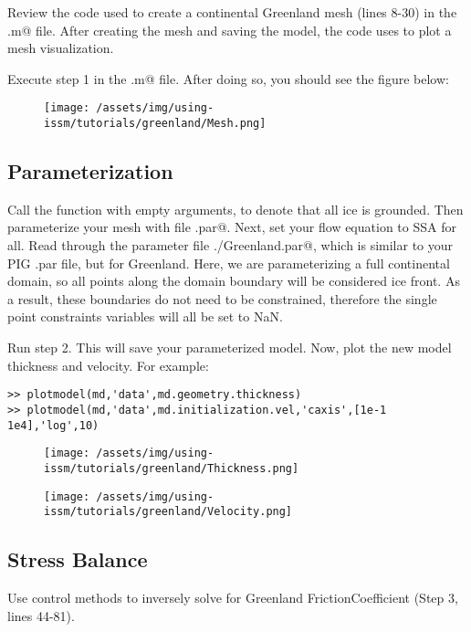 Review the code used to create a continental Greenland mesh (lines 8-30) in the \verb@readme.m@ file. After creating the mesh and saving the model, the code uses \verb@plotmodel@ to plot a mesh visualization.

Execute step 1 in the \verb@runme.m@ file. After doing so, you should see the figure below:
\begin{figure}[H]
	\begin{center}
		\texttt{[image: /assets/img/using-issm/tutorials/greenland/Mesh.png]}
	\end{center}
\end{figure}
\subsection{Parameterization} %
Call the \verb@setmask@ function with empty arguments, to denote that all ice is grounded. Then parameterize your mesh with file \verb@Greenland.par@. Next, set your flow equation to SSA for all. Read through the parameter file \verb@./Greenland.par@, which is similar to your PIG .par file, but for Greenland. Here, we are parameterizing a full continental domain, so all points along the domain boundary will be considered ice front. As a result, these boundaries do not need to be constrained, therefore the single point constraints variables will all be set to NaN.

Run step 2. This will save your parameterized model. Now, plot the new model thickness and velocity. For example:
\begin{verbatim}>> plotmodel(md,'data',md.geometry.thickness)
>> plotmodel(md,'data',md.initialization.vel,'caxis',[1e-1 1e4],'log',10)\end{verbatim}

\begin{figure}[H]
	\begin{center}
		\texttt{[image: /assets/img/using-issm/tutorials/greenland/Thickness.png]}
	\end{center}
\end{figure}

\begin{figure}[H]
	\begin{center}
		\texttt{[image: /assets/img/using-issm/tutorials/greenland/Velocity.png]}
	\end{center}
\end{figure}
\subsection{Stress Balance} %
Use control methods to inversely solve for Greenland FrictionCoefficient (Step 3, lines 44-81).

